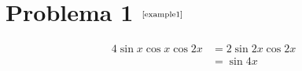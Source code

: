 \section*{Problema 1 $^{\text{\cite{example1}}}$}

\begin{equation}
    \label{eq:1}
    \begin{aligned}
        4\sin x \cos x \cos 2x & = 2\sin 2x \cos 2x \\
                               & = \sin 4x          \\
    \end{aligned}
\end{equation}